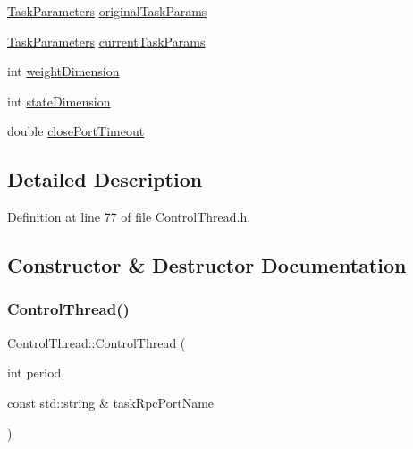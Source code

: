 \begin{DoxyCompactItemize}
\item 
\hyperlink{classocra__recipes_1_1TaskParameters}{Task\+Parameters} \hyperlink{classocra__recipes_1_1ControlThread_a352038d00d429ce8e1ef5defb88005cd}{original\+Task\+Params}
\item 
\hyperlink{classocra__recipes_1_1TaskParameters}{Task\+Parameters} \hyperlink{classocra__recipes_1_1ControlThread_ad2f5b157570bbcb6298d667cc264fc26}{current\+Task\+Params}
\item 
int \hyperlink{classocra__recipes_1_1ControlThread_a7499733b7dd28f8ff0168e206c5b325b}{weight\+Dimension}
\item 
int \hyperlink{classocra__recipes_1_1ControlThread_a1ab9aaa641766b8bf29812925701a52f}{state\+Dimension}
\item 
double \hyperlink{classocra__recipes_1_1ControlThread_a31d18ca1b7ac0c1dfd4a285bfd1fb7f7}{close\+Port\+Timeout}
\end{DoxyCompactItemize}


\subsection{Detailed Description}


Definition at line 77 of file Control\+Thread.\+h.



\subsection{Constructor \& Destructor Documentation}
\hypertarget{classocra__recipes_1_1ControlThread_a9cbd7d52df2dc070365a14d8c0c800f3}{}\label{classocra__recipes_1_1ControlThread_a9cbd7d52df2dc070365a14d8c0c800f3} 
\subsubsection{\texorpdfstring{Control\+Thread()}{ControlThread()}}
{\footnotesize\ttfamily Control\+Thread\+::\+Control\+Thread (\begin{DoxyParamCaption}\item[{int}]{period,  }\item[{const std\+::string \&}]{task\+Rpc\+Port\+Name }\end{DoxyParamCaption})}



